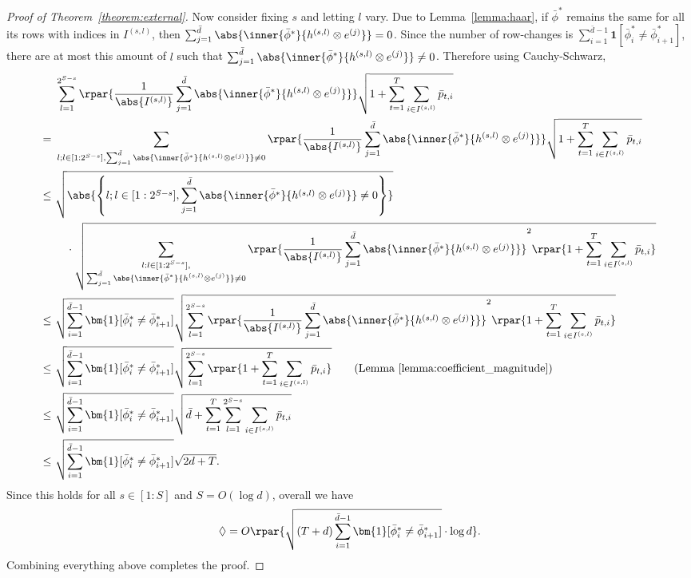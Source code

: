 \documentclass[10pt]{article}
\begin{document}
\begin{proof}[Proof of Theorem~\ref{theorem:external}]
Now consider fixing $s$ and letting $l$ vary. Due to Lemma~\ref{lemma:haar}, if $\bar\phi^*$ remains the same for all its rows with indices in $I^{(s,l)}$, then $\sum_{j=1}^{\bar d}\abs{\inner{\bar\phi^*}{h^{(s,l)}\otimes e^{(j)}}}=0$. Since the number of row-changes is $\sum_{i=1}^{\bar d-1}\bm{1}[\bar \phi^*_{i}\neq \bar \phi^*_{i+1}]$, there are at most this amount of $l$ such that $\sum_{j=1}^{\bar d}\abs{\inner{\bar\phi^*}{h^{(s,l)}\otimes e^{(j)}}}\neq 0$. Therefore using Cauchy-Schwarz, 
\begin{align*}
&\sum_{l=1}^{2^{S-s}}\rpar{\frac{1}{\abs{I^{(s,l)}}}\sum_{j=1}^{\bar d}\abs{\inner{\bar\phi^*}{h^{(s,l)}\otimes e^{(j)}}}}\sqrt{1+\sum_{t=1}^T\sum_{i\in I^{(s,l)}}\bar p_{t,i}}\\
=~&\sum_{l;l\in[1:2^{S-s}],\sum_{j=1}^{\bar d}\abs{\inner{\bar\phi^*}{h^{(s,l)}\otimes e^{(j)}}}\neq 0}\rpar{\frac{1}{\abs{I^{(s,l)}}}\sum_{j=1}^{\bar d}\abs{\inner{\bar\phi^*}{h^{(s,l)}\otimes e^{(j)}}}}\sqrt{1+\sum_{t=1}^T\sum_{i\in I^{(s,l)}}\bar p_{t,i}}\\
\leq~&\sqrt{\abs{\left\{l;l\in[1:2^{S-s}],\sum_{j=1}^{\bar d}\abs{\inner{\bar\phi^*}{h^{(s,l)}\otimes e^{(j)}}}\neq 0\right\}}}\\
&\quad\cdot\sqrt{\sum_{\substack{l:l\in[1:2^{S-s}],\\\sum_{j=1}^{\bar d}\abs{\inner{\bar\phi^*}{h^{(s,l)}\otimes e^{(j)}}}\neq 0}}\rpar{\frac{1}{\abs{I^{(s,l)}}}\sum_{j=1}^{\bar d}\abs{\inner{\bar\phi^*}{h^{(s,l)}\otimes e^{(j)}}}}^2\rpar{1+\sum_{t=1}^T\sum_{i\in I^{(s,l)}}\bar p_{t,i}}}\\
\leq~& \sqrt{\sum_{i=1}^{\bar d-1}\bm{1}[\bar \phi^*_{i}\neq \bar \phi^*_{i+1}]}\sqrt{\sum_{l=1}^{2^{S-s}}\rpar{\frac{1}{\abs{I^{(s,l)}}}\sum_{j=1}^{\bar d}\abs{\inner{\bar\phi^*}{h^{(s,l)}\otimes e^{(j)}}}}^2\rpar{1+\sum_{t=1}^T\sum_{i\in I^{(s,l)}}\bar p_{t,i}}}\\
\leq~& \sqrt{\sum_{i=1}^{\bar d-1}\bm{1}[\bar \phi^*_{i}\neq \bar \phi^*_{i+1}]}\sqrt{\sum_{l=1}^{2^{S-s}}\rpar{1+\sum_{t=1}^T\sum_{i\in I^{(s,l)}}\bar p_{t,i}}}\tag{Lemma~\ref{lemma:coefficient_magnitude}}\\
\leq~& \sqrt{\sum_{i=1}^{\bar d-1}\bm{1}[\bar \phi^*_{i}\neq \bar \phi^*_{i+1}]}\sqrt{\bar d+\sum_{t=1}^T\sum_{l=1}^{2^{S-s}}\sum_{i\in I^{(s,l)}}\bar p_{t,i}}\\
\leq~& \sqrt{\sum_{i=1}^{\bar d-1}\bm{1}[\bar \phi^*_{i}\neq \bar \phi^*_{i+1}]}\sqrt{2d+T}.
\end{align*}
Since this holds for all $s\in[1:S]$ and $S=O(\log d)$, overall we have
\begin{equation*}
\Diamond=O\rpar{\sqrt{(T+d)\sum_{i=1}^{\bar d-1}\bm{1}[\bar \phi^*_{i}\neq \bar \phi^*_{i+1}]}\cdot \log d}.
\end{equation*}
Combining everything above completes the proof.
\end{proof}
\end{document}
